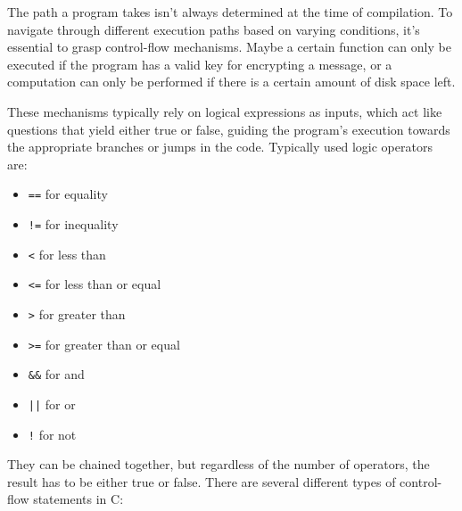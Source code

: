 \documentclass{dcbl/challenge}
\begin{document}
The path a program takes isn't always determined at the time of compilation. To navigate through different execution paths based on varying conditions, it's essential to grasp control-flow mechanisms. Maybe a certain function can only be executed if the program has a valid key for encrypting a message, or a computation can only be performed if there is a certain amount of disk space left.

These mechanisms typically rely on logical expressions as inputs, which act like questions that yield either true or false, guiding the program's execution towards the appropriate branches or jumps in the code.
Typically used logic operators are:
\begin{itemize}
    \item \texttt{==} for equality
    \item \texttt{!=} for inequality
    \item \texttt{<} for less than
    \item \texttt{<=} for less than or equal
    \item \texttt{>} for greater than
    \item \texttt{>=} for greater than or equal
    \item \texttt{\&\&} for and
    \item \texttt{||} for or
    \item \texttt{!} for not
\end{itemize} 
They can be chained together, but regardless of the number of operators, the result has to be either true or false.
There are several different types of control-flow statements in C:
\end{document}
